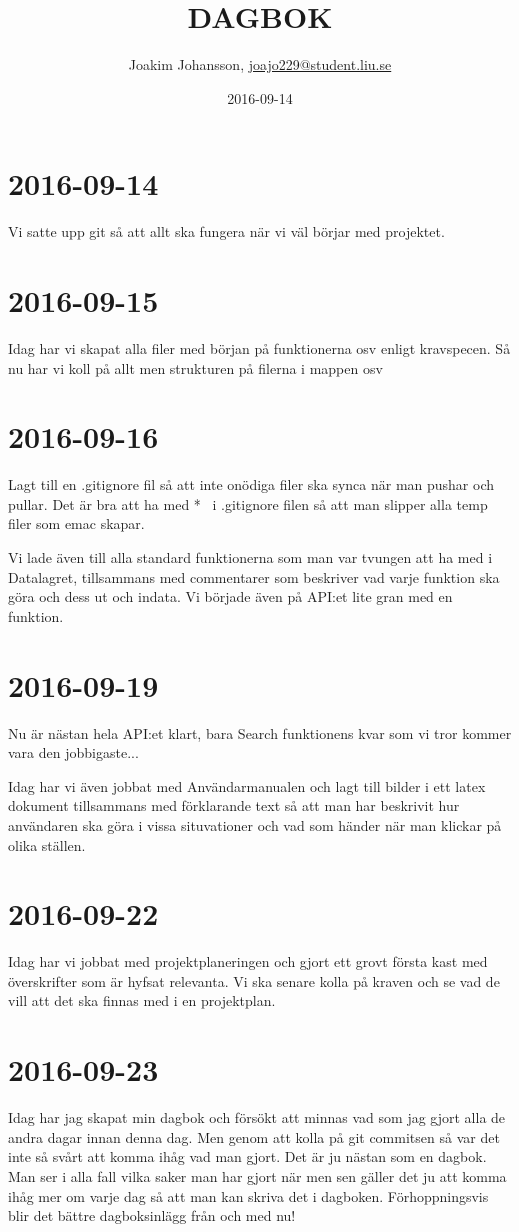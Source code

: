 \documentclass{TDP003mall}
\author{Joakim Johansson, \url{joajo229@student.liu.se}}
\title{DAGBOK}
\date{2016-09-14}
\begin{document}
\projectpage

\section*{2016-09-14}
Vi satte upp git så att allt ska fungera när vi väl börjar med projektet.

\section*{2016-09-15}
Idag har vi skapat alla filer med början på funktionerna osv enligt kravspecen. Så nu har vi koll på allt men strukturen på filerna i mappen osv

\section*{2016-09-16}
Lagt till en .gitignore fil så att inte onödiga filer ska synca när man pushar och pullar. Det är bra att ha med *~ i .gitignore filen så att man slipper alla temp filer som emac skapar.

Vi lade även till alla standard funktionerna som man var tvungen att ha med i Datalagret, tillsammans med commentarer som beskriver vad varje funktion ska göra och dess ut och indata. Vi började även på API:et lite gran med en funktion.

\section*{2016-09-19}
Nu är nästan hela API:et klart, bara Search funktionens kvar som vi tror kommer vara den jobbigaste...

Idag har vi även jobbat med Användarmanualen och lagt till bilder i ett latex dokument tillsammans med förklarande text så att man har beskrivit hur användaren ska göra i vissa situvationer och vad som händer när man klickar på olika ställen.

\section*{2016-09-22}
Idag har vi jobbat med projektplaneringen och gjort ett grovt första kast med överskrifter som är hyfsat relevanta. Vi ska senare kolla på kraven och se vad de vill att det ska finnas med i en projektplan.

\section*{2016-09-23}
Idag har jag skapat min dagbok och försökt att minnas vad som jag gjort alla de andra dagar innan denna dag. Men genom att kolla på git commitsen så var det inte så svårt att komma ihåg vad man gjort. Det är ju nästan som en dagbok. Man ser i alla fall vilka saker man har gjort när men sen gäller det ju att komma ihåg mer om varje dag så att man kan skriva det i dagboken. Förhoppningsvis blir det bättre dagboksinlägg från och med nu!
\end{document}
